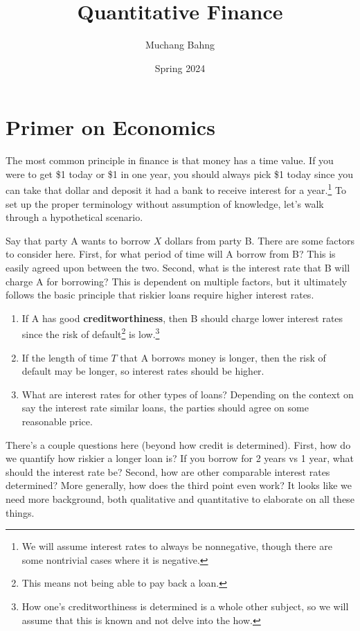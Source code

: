 \documentclass{article}
\begin{document}
\title{Quantitative Finance}
\author{Muchang Bahng}
\date{Spring 2024}

\maketitle
\tableofcontents
\pagebreak

\section{Primer on Economics}

    The most common principle in finance is that money has a time value. If you were to get \$1 today or \$1 in one year, you should always pick \$1 today since you can take that dollar and deposit it had a bank to receive interest for a year.\footnote{We will assume interest rates to always be nonnegative, though there are some nontrivial cases where it is negative.} To set up the proper terminology without assumption of knowledge, let's walk through a hypothetical scenario. 

    Say that party A wants to borrow $X$ dollars from party B. There are some factors to consider here. First, for what period of time will A borrow from B? This is easily agreed upon between the two. Second, what is the interest rate that B will charge A for borrowing? This is dependent on multiple factors, but it ultimately follows the basic principle that riskier loans require higher interest rates. 
    \begin{enumerate}
      \item If A has good \textbf{creditworthiness}, then B should charge lower interest rates since the risk of default\footnote{This means not being able to pay back a loan.} is low.\footnote{How one's creditworthiness is determined is a whole other subject, so we will assume that this is known and not delve into the how. }
      \item If the length of time $T$ that A borrows money is longer, then the risk of default may be longer, so interest rates should be higher. 
      \item What are interest rates for other types of loans? Depending on the context on say the interest rate similar loans, the parties should agree on some reasonable price.  
    \end{enumerate} 
    There's a couple questions here (beyond how credit is determined). First, how do we quantify how riskier a longer loan is? If you borrow for 2 years vs 1 year, what should the interest rate be? Second, how are other comparable interest rates determined? More generally, how does the third point even work? It looks like we need more background, both qualitative and quantitative to elaborate on all these things. 
\end{document}
